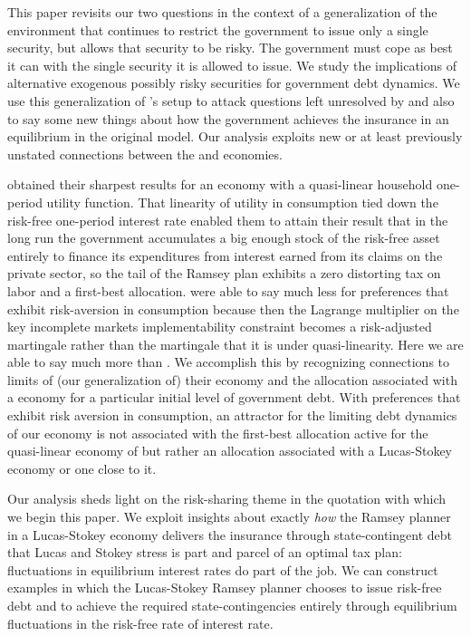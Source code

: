 \documentclass[12pt]{article}
\begin{document}
This paper revisits  our two questions in the context of a generalization of the \citet{Aiyagari2002} environment that continues to restrict
the government to issue only a single security, but allows that security to be risky.  The  government
must cope as best it can with the single security it is allowed to issue.  We study the implications of alternative exogenous possibly risky securities for government debt dynamics.  We use this generalization of \citeauthor{Aiyagari2002}'s setup to attack questions left unresolved by \citeauthor{Aiyagari2002}
and also to say some new things about how the government achieves  the insurance in an equilibrium in the original    \citet{LucasJr.1983}
model. Our analysis exploits  new or at least previously unstated connections between the \citeauthor{LucasJr.1983} and \citeauthor{Aiyagari2002} economies.

\citeauthor{Aiyagari2002} obtained their sharpest results for an economy with a quasi-linear household one-period utility function.
 That linearity of utility in consumption tied down the risk-free one-period interest rate enabled them to attain their result that in the long run the government accumulates a big enough stock of the risk-free asset entirely to finance its expenditures from interest earned from its claims
 on the private sector, so the tail of the Ramsey plan exhibits a zero distorting tax on labor and a first-best allocation.
\citeauthor{Aiyagari2002} were able to say much less for preferences that exhibit risk-aversion in consumption because then the Lagrange multiplier
on the key incomplete markets implementability constraint becomes a risk-adjusted martingale rather than the martingale that it is under quasi-linearity.  Here we are able to say much more  than \citeauthor{Aiyagari2002}. We accomplish this by recognizing connections to limits of (our generalization of)
their economy and the allocation associated with a \citeauthor{LucasJr.1983} economy for a particular initial level of government debt.
With preferences that exhibit risk aversion in consumption, an attractor for the limiting debt dynamics of our economy is not associated with  the first-best
allocation  active for the quasi-linear economy of \citeauthor{Aiyagari2002} but rather an allocation associated with a Lucas-Stokey economy or one close to it.

Our analysis sheds light on the risk-sharing theme in the quotation with which we begin this paper. We  exploit insights about exactly {\em how} the Ramsey planner
in a Lucas-Stokey economy delivers the insurance through state-contingent debt that Lucas and Stokey stress is part and parcel of an optimal tax plan:  fluctuations in
 equilibrium interest rates do part of the job.  We can construct examples in which the Lucas-Stokey Ramsey planner chooses to issue risk-free debt and to
 achieve the required state-contingencies entirely through equilibrium fluctuations in the risk-free rate of interest rate.
\end{document}
